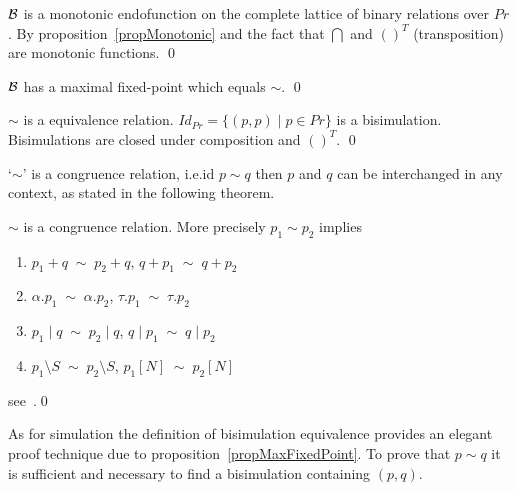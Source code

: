 \begin{proposition}
${\cal B}$ is a monotonic endofunction on the complete lattice of binary relations over $Pr$.
\proof By proposition~\ref{propMonotonic} and the fact that $\bigcap$ and $()^T$ (transposition) are monotonic functions.
\qed
\end{proposition}

\begin{proposition}
\label{propMaxFixedPoint}
$\cal B$ has a maximal fixed-point which equals $\sim$.
\qed
\end{proposition}

\begin{proposition}
$\sim$ is a equivalence relation.
\proof $Id_{Pr} = \{(p,p)\mid p\in Pr\}$ is a bisimulation. Bisimulations are closed under composition and $()^T$.
\qed
\end{proposition}

`$\sim$' is a congruence relation, i.e.\@ id $p\sim q$ then $p$ and $q$ can be interchanged in any context, as stated in the following theorem.

\begin{theorem}
$\sim$ is a congruence relation. More precisely $p_1\sim p_2$ implies
\begin{enumerate}
\item $p_1+q\;\sim\; p_2+q$, $q+p_1\;\sim\; q+p_2$
\item $\alpha.p_1\;\sim\;\alpha.p_2$, $\tau.p_1\;\sim\;\tau.p_2$
\item $p_1\mid q\;\sim\; p_2\mid q$, $q\mid p_1\;\sim\; q\mid p_2$
\item $p_1\setminus S\;\sim\; p_2\setminus S$, $p_1[N]\;\sim\; p_2[N]$
\end{enumerate}
\proof see~\cite{Milner}.\qed
\end{theorem}

As for simulation the definition of bisimulation equivalence provides an elegant proof technique due to proposition~\ref{propMaxFixedPoint}. To prove that $p\sim q$ it is sufficient and necessary to find a bisimulation containing $(p,q)$.

